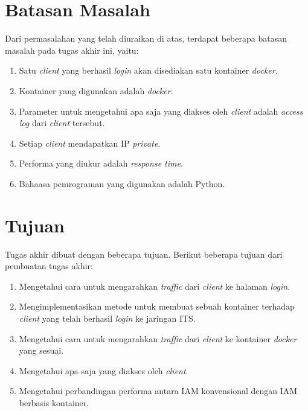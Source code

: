 	\section{Batasan Masalah}
	 Dari permasalahan yang telah diuraikan di atas, terdapat beberapa batasan masalah pada tugas akhir ini, yaitu:
	\begin{enumerate}
     \item Satu \textit{client} yang berhasil \textit{login} akan disediakan satu kontainer \textit{docker}.
     \item Kontainer yang digunakan adalah \textit{docker}.
	 \item Parameter untuk mengetahui apa saja yang diakses oleh \textit{client} adalah \textit{access log} dari \textit{client} tersebut.
	 \item Setiap \textit{client} mendapatkan IP \textit{private}.
     \item Performa yang diukur adalah \textit{response time}.
     \item Bahaasa pemrograman yang digunakan adalah Python.
	\end{enumerate}
    
   \section{Tujuan}
	Tugas akhir dibuat dengan beberapa tujuan. Berikut beberapa tujuan dari pembuatan tugas akhir:
	\begin{enumerate}
	 \item Mengetahui cara untuk mengarahkan \textit{traffic} dari \textit{client} ke halaman \textit{login}.
	 \item Mengimplementasikan metode untuk membuat sebuah kontainer terhadap \textit{client} yang telah berhasil \textit{login} ke jaringan ITS.
	 \item Mengetahui cara untuk mengarahkan \textit{traffic} dari \textit{client} ke kontainer \textit{docker} yang sesuai.
	 \item Mengetahui apa saja yang diakses oleh \textit{client}.
	 \item Mengetahui perbandingan performa antara IAM konvensional dengan IAM berbasis kontainer.
	\end{enumerate}
     
